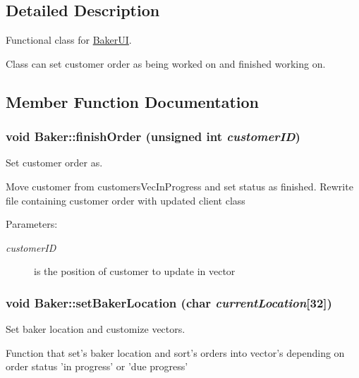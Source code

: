 \subsection{Detailed Description}
Functional class for \hyperlink{class_baker_u_i}{Baker\-UI}. 

Class can set customer order as being worked on and finished working on. 



\subsection{Member Function Documentation}
\hypertarget{class_baker_222a16bf113b70cbe0388a7291978a57}{
\subsubsection[finishOrder]{\setlength{\rightskip}{0pt plus 5cm}void Baker::finish\-Order (unsigned int {\em customer\-ID})}}
\label{class_baker_222a16bf113b70cbe0388a7291978a57}


Set customer order as. 

Move customer from customers\-Vec\-In\-Progress and set status as finished. Rewrite file containing customer order with updated client class

\begin{Desc}
\item[Parameters:]
\begin{description}
\item[{\em customer\-ID}]is the position of customer to update in vector \end{description}
\end{Desc}
\hypertarget{class_baker_b85151ecb20282d81b4dab489fea7dd8}{
\subsubsection[setBakerLocation]{\setlength{\rightskip}{0pt plus 5cm}void Baker::set\-Baker\-Location (char {\em current\-Location}\mbox{[}32\mbox{]})}}
\label{class_baker_b85151ecb20282d81b4dab489fea7dd8}


Set baker location and customize vectors. 

Function that set's baker location and sort's orders into vector's depending on order status 'in progress' or 'due progress'

